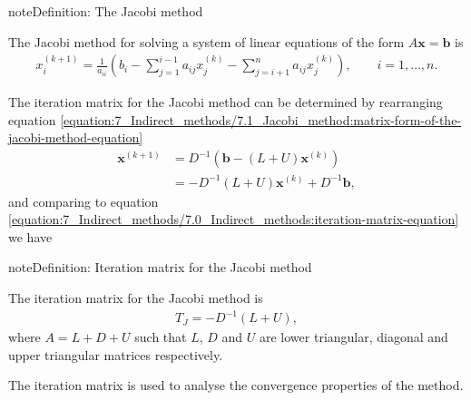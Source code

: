 \documentclass[letterpaper,10pt,english]{jupyterBook}
\begin{document}
\begin{sphinxadmonition}{note}{Definition: The Jacobi method}

\sphinxAtStartPar
The Jacobi method for solving a system of linear equations of the form \(A \mathbf{x} = \mathbf{b}\) is
\begin{equation}\label{equation:7_Indirect_methods/7.1_Jacobi_method:jacobi-method-equation}
\begin{split}    x_i^{(k+1)} = \frac{1}{a_{ii}} \left( b_i - \sum_{j = 1}^{i-1} a_{ij} x_j^{(k)} - \sum_{j = i+1}^n a_{ij} x_j^{(k)} \right), \qquad i = 1, \ldots ,n.\end{split}
\end{equation}\end{sphinxadmonition}

\sphinxAtStartPar
The iteration matrix for the Jacobi method can be determined by rearranging equation \eqref{equation:7_Indirect_methods/7.1_Jacobi_method:matrix-form-of-the-jacobi-method-equation}
\begin{align*}
    \mathbf{x}^{(k+1)} &= D^{-1}(\mathbf{b} - (L + U) \mathbf{x}^{(k)}) \\
    &= - D^{-1}(L + U) \mathbf{x}^{(k)} + D^{-1}\mathbf{b},
\end{align*}
\sphinxAtStartPar
and comparing to equation \eqref{equation:7_Indirect_methods/7.0_Indirect_methods:iteration-matrix-equation} we have

\begin{sphinxadmonition}{note}{Definition: Iteration matrix for the Jacobi method}

\sphinxAtStartPar
The iteration matrix for the Jacobi method is
\begin{equation}\label{equation:7_Indirect_methods/7.1_Jacobi_method:jacobi-method-iteration-matrix-equation}
\begin{split}T_J = - D^{-1}(L + U),\end{split}
\end{equation}
\sphinxAtStartPar
where \(A = L + D + U\) such that \(L\), \(D\) and \(U\) are lower triangular, diagonal and upper triangular matrices respectively.
\end{sphinxadmonition}

\sphinxAtStartPar
The iteration matrix is used to analyse the convergence properties of the method.
\end{document}
